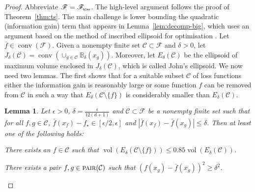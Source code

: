 \documentclass[letter, 12pt]{report}
\newcommand{\pr}{\text{\tiny\texttt{r}}}
\newcommand{\pb}{\text{\tiny\texttt{b}}}
\newcommand{\pl}{\text{\tiny\texttt{l}}}
\renewcommand{\pm}{\text{\tiny\texttt{m}}}
\newcommand{\pair}{\operatorname{\textsc{pair}}}
\newcommand{\ball}{\mathbb{B}}
\newcommand{\cC}{\mathcal C}
\newcommand{\sF}{\mathscr F}
\newcommand{\vol}{\operatorname{vol}}
\newcommand{\conv}{\operatorname{conv}}
\newcommand{\1}{\mathbf{1}}
\theoremstyle{plain}
\newtheorem{lemma}[theorem]{Lemma}
\theoremstyle{definition}
\theoremstyle{remark}
\begin{document}
\begin{proof}
    Abbreviate $\sF = \sF_{\pb\pl\pm\pr}$.
    The high-level argument follows the proof of Theorem~\ref{thm:ts}.
    The main challenge is lower bounding the quadratic (information gain) term that appears in Lemma~\ref{lem:decomp-big},
    which uses an argument based on the method of inscribed ellipsoid for optimisation \citep{tarasov1988method}.
    Let $\bar f \in \conv(\sF)$.
    Given a nonempty finite set $\cC \subset \sF$ and $\delta > 0$, let
    $J_\delta(\cC) = \conv\left(\cup_{g \in \cC} \ball_\delta(x_g)\right)$.
    Moreover, let $E_\delta(\cC)$ be the ellipsoid of maximum volume enclosed in $J_\delta(\cC)$, which is called John's ellipsoid.
    We now need two lemmas. The first shows that for a suitable subset $\cC$ of loss functions either the information gain is reasonably large
    or some function $f$ can be removed from $\cC$ in such a way that $E_\delta(\cC \setminus \{f\})$ is considerably smaller than $E_\delta(\cC)$.

    \begin{lemma}\label{lem:ridge-ir-1}
        Let $\epsilon > 0$, $\delta = \frac{\epsilon}{12(d+1)}$ and $\cC \subset \sF$ be a nonempty finite set such that for all $f, g \in \cC$,
        $\bar f(x_f) - f_\star \in [\epsilon/2, \epsilon]$ and
        $|\bar f(x_f) - \bar f(x_g)| \leq \delta$.
        Then at least one of the following holds:
        \begin{enumroman}
            \item There exists an $f \in \cC$ such that $\vol(E_\delta(\cC \setminus \{f\})) \leq 0.85 \vol(E_\delta(\cC))$. \label{lem:ridge-ir-1:a}
            \item There exists a pair $f, g \in \pair(\cC)$ such that $(f(x_g) - \bar f(x_g))^2 \geq \delta^2$. \label{lem:ridge-ir-1:b}
        \end{enumroman}
    \end{lemma}


\end{proof}
\end{document}

